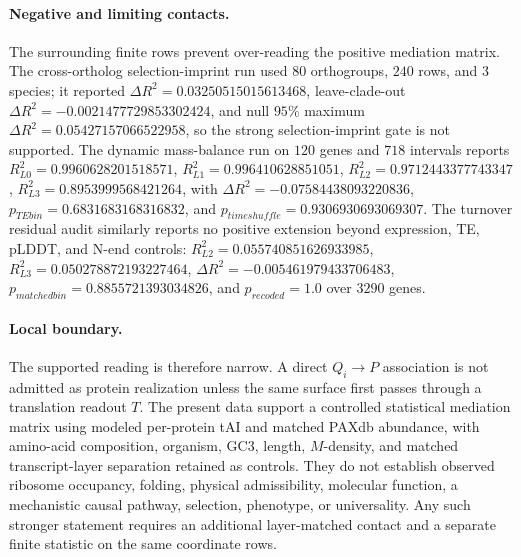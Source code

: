 \paragraph{Negative and limiting contacts.}
The surrounding finite rows prevent over-reading the positive mediation matrix.  The cross-ortholog selection-imprint run used $80$ orthogroups, $240$ rows, and $3$ species; it reported $\Delta R^2=0.03250515015613468$, leave-clade-out $\Delta R^2=-0.0021477729853302424$, and null $95\%$ maximum $\Delta R^2=0.05427157066522958$, so the strong selection-imprint gate is not supported.  The dynamic mass-balance run on $120$ genes and $718$ intervals reports $R^2_{L0}=0.9960628201518571$, $R^2_{L1}=0.996410628851051$, $R^2_{L2}=0.9712443377743347$, $R^2_{L3}=0.8953999568421264$, with $\Delta R^2=-0.07584438093220836$, $p_{TEbin}=0.6831683168316832$, and $p_{timeshuffle}=0.9306930693069307$.  The turnover residual audit similarly reports no positive extension beyond expression, TE, pLDDT, and N-end controls: $R^2_{L2}=0.055740851626933985$, $R^2_{L3}=0.050278872193227464$, $\Delta R^2=-0.005461979433706483$, $p_{matchedbin}=0.8855721393034826$, and $p_{recoded}=1.0$ over $3290$ genes.

\paragraph{Local boundary.}
The supported reading is therefore narrow.  A direct $Q_i\to P$ association is not admitted as protein realization unless the same surface first passes through a translation readout $T$.  The present data support a controlled statistical mediation matrix using modeled per-protein tAI and matched PAXdb abundance, with amino-acid composition, organism, GC3, length, $M$-density, and matched transcript-layer separation retained as controls.  They do not establish observed ribosome occupancy, folding, physical admissibility, molecular function, a mechanistic causal pathway, selection, phenotype, or universality.  Any such stronger statement requires an additional layer-matched contact and a separate finite statistic on the same coordinate rows.
